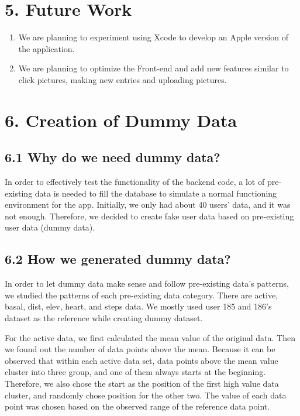 \documentclass[]{book}
\providecommand{\tightlist}{%
  \setlength{\itemsep}{0pt}\setlength{\parskip}{0pt}}
\begin{document}
\section{5. Future Work}\label{future-work-1}

\begin{enumerate}
\def\labelenumi{\arabic{enumi})}
\tightlist
\item
  We are planning to experiment using Xcode to develop an Apple version
  of the application.
\item
  We are planning to optimize the Front-end and add new features similar
  to click pictures, making new entries and uploading pictures.
\end{enumerate}

\section{6. Creation of Dummy Data}\label{creation-of-dummy-data-1}

\subsection{6.1 Why do we need dummy
data?}\label{why-do-we-need-dummy-data-1}

In order to effectively test the functionality of the backend code, a
lot of pre-existing data is needed to fill the database to simulate a
normal functioning environment for the app. Initially, we only had about
40 users' data, and it was not enough. Therefore, we decided to create
fake user data based on pre-existing user data (dummy data).

\subsection{6.2 How we generated dummy
data?}\label{how-we-generated-dummy-data-1}

In order to let dummy data make sense and follow pre-existing data's
patterns, we studied the patterns of each pre-existing data category.
There are active, basal, dist, elev, heart, and steps data. We mostly
used user 185 and 186's dataset as the reference while creating dummy
dataset.

For the active data, we first calculated the mean value of the original
data. Then we found out the number of data points above the mean.
Because it can be observed that within each active data set, data points
above the mean value cluster into three group, and one of them always
starts at the beginning. Therefore, we also chose the start as the
position of the first high value data cluster, and randomly chose
position for the other two. The value of each data point was chosen
based on the observed range of the reference data point.
\end{document}
